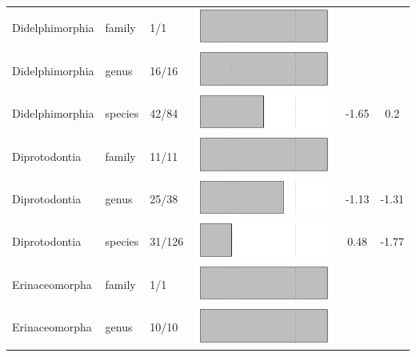 \begin{longtable}{lL{1.8cm}C{2cm}lcc}
  Didelphimorphia & family & 1/1 & \includegraphics[width=0.20\linewidth, height=0.05\linewidth]{Results_1c/Table_figures/bar22.pdf} &   &   \\ 
  Didelphimorphia & genus & 16/16 & \includegraphics[width=0.20\linewidth, height=0.05\linewidth]{Results_1c/Table_figures/bar23.pdf} &   &   \\ 
  Didelphimorphia & species & 42/84 & \includegraphics[width=0.20\linewidth, height=0.05\linewidth]{Results_1c/Table_figures/bar24.pdf} & -1.65 & 0.2 \\ 
  Diprotodontia & family & 11/11 & \includegraphics[width=0.20\linewidth, height=0.05\linewidth]{Results_1c/Table_figures/bar25.pdf} &   &   \\ 
  Diprotodontia & genus & 25/38 & \includegraphics[width=0.20\linewidth, height=0.05\linewidth]{Results_1c/Table_figures/bar26.pdf} & -1.13 & -1.31 \\ 
  Diprotodontia & species & 31/126 & \includegraphics[width=0.20\linewidth, height=0.05\linewidth]{Results_1c/Table_figures/bar27.pdf} & 0.48 & -1.77 \\ 
  Erinaceomorpha & family & 1/1 & \includegraphics[width=0.20\linewidth, height=0.05\linewidth]{Results_1c/Table_figures/bar28.pdf} &   &   \\ 
  Erinaceomorpha & genus & 10/10 & \includegraphics[width=0.20\linewidth, height=0.05\linewidth]{Results_1c/Table_figures/bar29.pdf} &   &   \\ 

\end{longtable}
